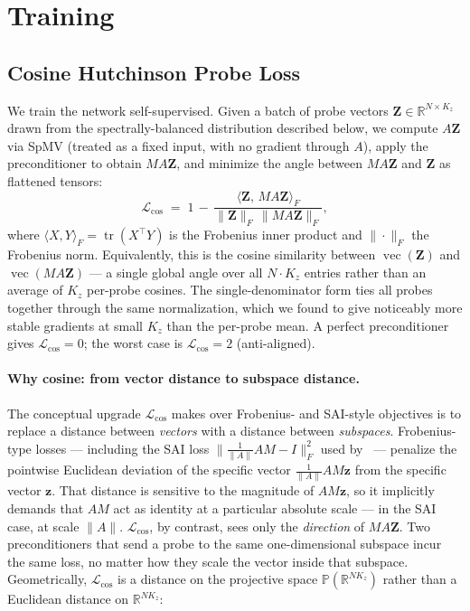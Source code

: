 \documentclass[acmtog,anonymous,review]{acmart}
\theoremstyle{plain}
\begin{document}
\section{Training}
\label{sec:training}

\subsection{Cosine Hutchinson Probe Loss}
\label{sec:training:loss}

We train the network self-supervised. Given a batch of probe vectors
$\mathbf{Z}\in\mathbb{R}^{N\times K_z}$ drawn from the spectrally-balanced distribution
described below, we compute $A\mathbf{Z}$ via SpMV (treated as a fixed input, with no
gradient through $A$), apply the preconditioner to obtain $MA\mathbf{Z}$, and minimize the
angle between $MA\mathbf{Z}$ and $\mathbf{Z}$ as flattened tensors:
\begin{equation}
  \mathcal{L}_{\cos}
  \;=\; 1 \,-\, \frac{\langle \mathbf{Z},\,MA\mathbf{Z}\rangle_F}
        {\|\mathbf{Z}\|_F\,\|MA\mathbf{Z}\|_F},
  \label{eq:loss}
\end{equation}
where $\langle X,Y\rangle_F = \operatorname{tr}(X^\top Y)$ is the Frobenius inner product and
$\|\!\cdot\!\|_F$ the Frobenius norm. Equivalently, this is the cosine similarity between
$\operatorname{vec}(\mathbf{Z})$ and $\operatorname{vec}(MA\mathbf{Z})$ --- a single global
angle over all $N\!\cdot\!K_z$ entries rather than an average of $K_z$ per-probe cosines.
The single-denominator form ties all probes together through the same normalization, which
we found to give noticeably more stable gradients at small $K_z$ than the per-probe mean.
A perfect preconditioner gives $\mathcal{L}_{\cos}\!=\!0$; the worst case is
$\mathcal{L}_{\cos}\!=\!2$ (anti-aligned).

\paragraph{Why cosine: from vector distance to subspace distance.}
The conceptual upgrade $\mathcal{L}_{\cos}$ makes over Frobenius- and SAI-style objectives
is to replace a distance between \emph{vectors} with a distance between \emph{subspaces}.
Frobenius-type losses --- including the SAI loss
$\bigl\|\tfrac{1}{\|A\|}AM-I\bigr\|_F^2$ used by~\cite{Yang2025sparse} --- penalize the
pointwise Euclidean deviation of the specific vector $\tfrac{1}{\|A\|}AM\mathbf{z}$ from the
specific vector $\mathbf{z}$. That distance is sensitive to the magnitude of $AM\mathbf{z}$,
so it implicitly demands that $AM$ act as identity at a particular absolute scale --- in the
SAI case, at scale $\|A\|$. $\mathcal{L}_{\cos}$, by contrast, sees only the
\emph{direction} of $MA\mathbf{Z}$. Two preconditioners that send a probe to the same
one-dimensional subspace incur the same loss, no matter how they scale the vector inside
that subspace. Geometrically, $\mathcal{L}_{\cos}$ is a distance on the projective space
$\mathbb{P}(\mathbb{R}^{NK_z})$ rather than a Euclidean distance on $\mathbb{R}^{NK_z}$:
\end{document}

